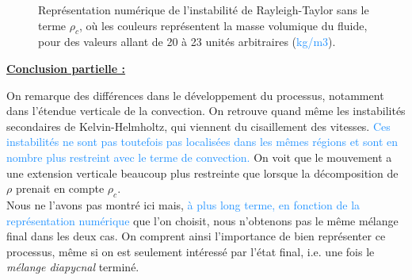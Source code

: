 \documentclass{rapportECC}
\newcommand{\FAadd}[1]{\textcolor{DodgerBlue}{{#1}}}                     %
\begin{document}
\begin{figure}[H]
    \centering
    \hfill
    \caption{Représentation numérique de l'instabilité de Rayleigh-Taylor sans le terme $\rho_c$, où les couleurs représentent la masse volumique du fluide, pour des valeurs allant de 20 à 23 unités arbitraires (\FAadd{kg/m3}).}
    \label{fig:images_cote_a_cote}
\end{figure}
\underline{\textbf{Conclusion partielle :}} \\
\vspace{0.5 cm}

On remarque des différences dans le développement du processus, notamment dans l'étendue verticale de la convection. On retrouve quand même les instabilités secondaires de Kelvin-Helmholtz, qui viennent du cisaillement des vitesses. \FAadd{Ces instabilités ne sont pas toutefois pas localisées dans les mêmes régions et sont en nombre plus restreint avec le terme de convection.}    
On voit que le mouvement a une extension verticale beaucoup plus restreinte que lorsque la décomposition de $\rho$ prenait en compte $\rho_c$. \\
Nous ne l'avons pas montré ici mais, \FAadd{à plus long terme, en fonction de la représentation numérique} que l'on choisit, nous n'obtenons pas le même mélange final dans les deux cas. On comprent ainsi l'importance de bien représenter ce processus, même si on est seulement intéressé par l'état final, i.e. une fois le \textit{mélange diapycnal} terminé.
\\
\end{document}
